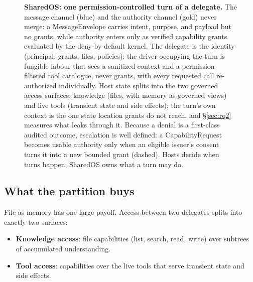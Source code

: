 \documentclass[10pt,a4paper]{article}
\begin{document}
\begin{figure}[t]
\caption{\textbf{SharedOS: one permission-controlled turn of a delegate.} The message channel (blue) and the authority channel (gold) never merge: a MessageEnvelope carries intent, purpose, and payload but no grants, while authority enters only as verified capability grants evaluated by the deny-by-default kernel. The delegate is the identity (principal, grants, files, policies); the driver occupying the turn is fungible labour that sees a sanitized context and a permission-filtered tool catalogue, never grants, with every requested call re-authorized individually. Host state splits into the two governed access surfaces: knowledge (files, with memory as governed views) and live tools (transient state and side effects); the turn's own context is the one state location grants do not reach, and \S\ref{sec:rq2} measures what leaks through it. Because a denial is a first-class audited outcome, escalation is well defined: a CapabilityRequest becomes usable authority only when an eligible issuer's consent turns it into a new bounded grant (dashed). Hosts decide when turns happen; SharedOS owns what a turn may do.}
\label{fig:sharedos}
\end{figure}

\subsection{What the partition buys}
\label{sec:filesasmemory}

File-as-memory has one large payoff. Access between two delegates splits into exactly two surfaces:

\begin{itemize}
\item \textbf{Knowledge access}: file capabilities (list, search, read, write) over subtrees of accumulated understanding.
\item \textbf{Tool access}: capabilities over the live tools that serve transient state and side effects.
\end{itemize}
\end{document}
